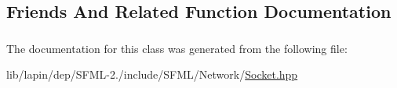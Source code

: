 \subsection{Friends And Related Function Documentation}
\hypertarget{classsf_1_1_socket_a4d597c43b180384801eff14207b0e137}{
\subsubsection[{Socket\-Selector}]{\hspace{0.3cm}{\ttfamily [friend]}}}\label{classsf_1_1_socket_a4d597c43b180384801eff14207b0e137}


The documentation for this class was generated from the following file\-:\begin{DoxyCompactItemize}
\item 
lib/lapin/dep/\-S\-F\-M\-L-\/2./include/\-S\-F\-M\-L/\-Network/\hyperlink{lapin_2dep_2_s_f_m_l-2_83_2include_2_s_f_m_l_2_network_2_socket_8hpp}{Socket.\-hpp}\end{DoxyCompactItemize}
